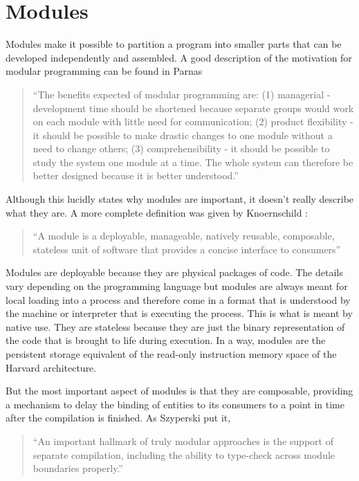 \section{Modules}
\label{sec:modules}

Modules make it possible to partition a program into smaller parts that can be developed independently and assembled.
A good description of the motivation for modular programming can be found in Parnas \cite{Parnas}

\begin{quotation}
``The benefits expected of modular programming are:
(1) managerial - development time should be shortened because separate groups would work on each module with little need for communication;
(2) product flexibility - it should be possible to make drastic changes to one module without a need to change others;
(3) comprehensibility - it should be possible to study the system one module at a time. The whole system can therefore be better designed because it is better understood.''
\end{quotation}

Although this lucidly states why modules are important, it doesn't really describe what they are. A more complete
definition was given by Knoernschild \cite{Knoernschild}:

\begin{quotation}
``A module is a deployable, manageable, natively reusable, composable, stateless unit of software that provides a concise interface to consumers''
\end{quotation}

Modules are deployable because they are physical packages of code. The details vary depending on the programming language but modules are
always meant for local loading into a process and therefore come in a format that is understood by the machine or interpreter that is
executing the process. This is what is meant by native use. They are stateless because they are just the binary representation of the
code that is brought to life during execution. In a way, modules are the persistent storage equivalent of the read-only instruction
memory space of the Harvard architecture.

But the most important aspect of modules is that they are composable, providing a mechanism to delay the binding of entities to its consumers
to a point in time after the compilation is finished. As Szyperski \cite{Szyperski} put it,

\begin{quotation}
``An important hallmark of truly modular approaches is the support of separate compilation, including the ability
to type-check across module boundaries properly.'' %
\end{quotation}

